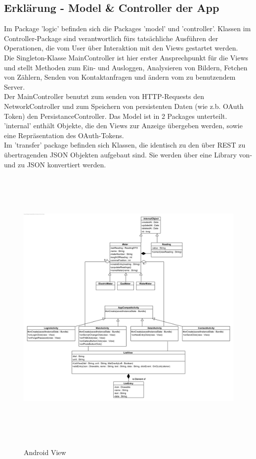 \subsection*{Erklärung - Model \& Controller der App}
Im Package 'logic' befinden sich die Packages 'model' und 'controller'.
Klassen im Controller-Package sind verantwortlich fürs tatsächliche Ausführen der Operationen, die vom User über Interaktion mit den Views gestartet werden. \\ Die Singleton-Klasse MainController ist hier erster Ansprechpunkt für die Views und stellt Methoden zum Ein- und Ausloggen, Analysieren von Bildern, Fetchen von Zählern, Senden von Kontaktanfragen und ändern vom zu benutzendem Server. \\ Der MainController benutzt zum senden von HTTP-Requests den NetworkController und zum Speichern von persistenten Daten (wie z.b. OAuth Token) den PersistanceController.
Das Model ist in 2 Packages unterteilt. 'internal' enthält Objekte, die den Views zur Anzeige übergeben werden, sowie eine Repräsentation des OAuth-Tokens. \\ Im 'transfer' package befinden sich Klassen, die identisch zu den über REST zu übertragenden JSON Objekten aufgebaut sind. Sie werden über eine Library von- und zu JSON konvertiert werden.

\begin{figure}[H]
\hspace{-1cm}
\includegraphics[height=14cm]{img/diagrams/Android-Class-Diagram-View}\\
\caption{Android View}
\end{figure}

